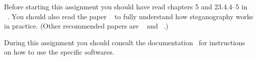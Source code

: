 Before starting this assignment you should have read chapters 5 and 23.4.4--5 
in ~\cite{Anderson2008sea}.
You should also read the paper 
~\cite{johnson1998exploring} to fully 
understand how steganography works in practice.
(Other recommended papers are 
~\cite{anderson1998limits} and 
~\cite{provos2003hide}.)

During this assignment you should consult the 
documentation~\cite{gpgdoc,gpg4windoc,outguess,openpuffdoc} for instructions on
how to use the specific softwares.
